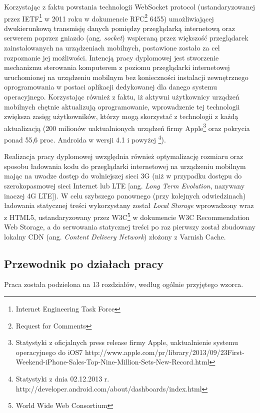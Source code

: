 Korzystając z faktu powstania technologii WebSocket protocol (ustandaryzowanej przez IETF\footnote{Internet Engineering Task Force} w 2011 roku w dokumencie RFC\footnote{Request for Comments} 6455\cite{websockets-rfc}) umożliwiającej dwukierunkową transmisję danych pomiędzy przeglądarką internetową oraz serwerem poprzez gniazdo (ang. \emph{socket})  wspieraną przez większość przeglądarek zainstalowanych na urządzeniach mobilnych, postawione zostało za cel rozpoznanie jej możliwości. Intencją pracy dyplomowej jest stworzenie mechanizmu sterowania komputerem z poziomu przeglądarki internetowej uruchomionej na urządzeniu mobilnym bez konieczności instalacji zewnętrznego oprogramowania w postaci aplikacji dedykowanej dla danego systemu operacyjnego. Korzystając również z faktu, iż aktywni użytkownicy urządzeń mobilnych chętnie aktualizują oprogramowanie, wprowadzenie tej technologii zwiększa zasięg użytkowników, którzy mogą skorzystać z technologii z każdą aktualizacją (200 milionów uaktualnionych urządzeń firmy Apple\footnote{Statystyki z oficjalnych press release firmy Apple, uaktualnienie systemu operacyjnego do iOS7 http://www.apple.com/pr/library/2013/09/23First-Weekend-iPhone-Sales-Top-Nine-Million-Sets-New-Record.html} oraz pokrycia ponad 55,6 proc. Androida w wersji 4.1 i powyżej \footnote{Statystyki z dnia 02.12.2013 r. http://developer.android.com/about/dashboards/index.html}).

Realizacja pracy dyplomowej uwzględnia również optymalizację rozmiaru oraz sposobu ładowania kodu do przeglądarki internetowej na urządzeniu mobilnym mając na uwadze dostęp do wolniejszej sieci 3G (niż w przypadku dostępu do szerokopasmowej sieci Internet lub LTE [ang. \emph{Long Term Evolution}, nazywany inaczej 4G LTE]). W celu szybszego ponownego (przy kolejnych odwiedzinach) ładowania statycznej treści wykorzystany został \emph{Local Storage}\cite{webstorage} wprowadzony wraz z HTML5, ustandaryzowany przez W3C\footnote{World Wide Web Consortium} w dokumencie W3C Recommendation Web Storage, a do serwowania statycznej treści po raz pierwszy został zbudowany lokalny CDN (ang. \emph{Content Delivery Network}) złożony z Varnish Cache.

\subsection{Przewodnik po działach pracy}

Praca została podzielona na 13 rozdziałów, według ogólnie przyjętego wzorca. 

\par

